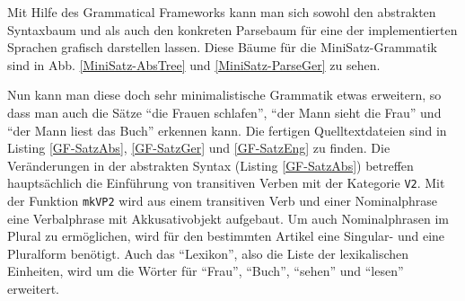 Mit Hilfe des Grammatical Frameworks kann man sich sowohl den abstrakten Syntaxbaum und als auch den konkreten Parsebaum für eine der implementierten Sprachen grafisch darstellen lassen. Diese Bäume für die MiniSatz-Grammatik sind in Abb. \ref{MiniSatz-AbsTree} und \ref{MiniSatz-ParseGer} zu sehen. \par

Nun kann man diese doch sehr minimalistische Grammatik etwas erweitern, so dass man auch die Sätze "`die Frauen schlafen"', "`der Mann sieht die Frau"' und "`der Mann liest das Buch"' erkennen kann. Die fertigen Quelltextdateien sind in Listing \ref{GF-SatzAbs}, \ref{GF-SatzGer} und \ref{GF-SatzEng} zu finden. Die Veränderungen in der abstrakten Syntax (Listing \ref{GF-SatzAbs}) betreffen hauptsächlich die Einführung von transitiven Verben mit der Kategorie \texttt{V2}. Mit der Funktion \texttt{mkVP2} wird aus einem transitiven Verb und einer Nominalphrase eine Verbalphrase mit Akkusativobjekt aufgebaut. Um auch Nominalphrasen im Plural zu ermöglichen, wird für den bestimmten Artikel eine Singular- und eine Pluralform benötigt. Auch das "`Lexikon"', also die Liste der lexikalischen Einheiten, wird um die Wörter für "`Frau"', "`Buch"', "`sehen"' und "`lesen"' erweitert. \par

